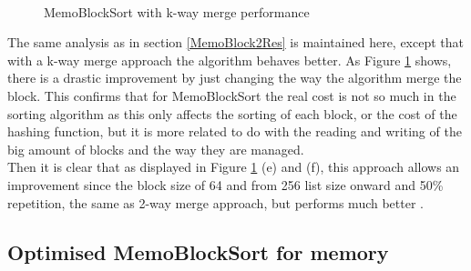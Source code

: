 \documentclass[a4paper,12pt]{article}
\begin{document}
\begin{figure}[H]
\\ %
%
\hfill %
%
\caption{MemoBlockSort with k-way merge performance}
\label{fig:MemoBlockSortKWayGraph}
\end{figure}

The same analysis as in section \ref{MemoBlock2Res} is maintained here, except that with a k-way merge approach the algorithm behaves better. As Figure \ref{fig:MemoBlockSortKWayGraph} shows, there is a drastic improvement by just changing the way the algorithm merge the block. 
This confirms that for MemoBlockSort the real cost is not so much in the sorting algorithm as this only affects the sorting of each block, or the cost of the hashing function, but it  is more related to do with the reading and writing of the big amount of blocks and the way they are managed.\\

Then it is clear that as displayed in Figure \ref{fig:MemoBlockSortKWayGraph} (e) and (f), this approach allows an improvement since the block size of 64 and from 256 list size onward and 50\% repetition, the same as 2-way merge approach, but performs much better .

\subsection{Optimised MemoBlockSort for memory}
\end{document}
